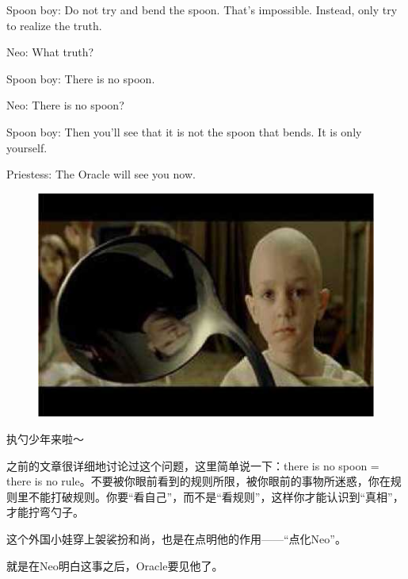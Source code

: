 \documentclass{ctexart}
\newenvironment{myquote}{\color{green} \setlength{\leftskip}{6em} \setlength{\rightskip}{4em} \setlength{\parindent}{-2em}}{\par}
\begin{document}
\begin{myquote}
Spoon boy: Do not try and bend the spoon. That's impossible. Instead, only try to realize the truth.

Neo: What truth?

Spoon boy: There is no spoon.

Neo: There is no spoon?

Spoon boy: Then you'll see that it is not the spoon that bends. It is only yourself.

Priestess: The Oracle will see you now.
\end{myquote}

\begin{figure}[htb]
\centering
\includegraphics[width=0.5\linewidth]{fig/read_Matrix-45}
\end{figure}

执勺少年来啦～

之前的文章很详细地讨论过这个问题，这里简单说一下：there is no spoon = there is no rule。不要被你眼前看到的规则所限，被你眼前的事物所迷惑，你在规则里不能打破规则。你要“看自己”，而不是“看规则”，这样你才能认识到“真相”，才能拧弯勺子。

这个外国小娃穿上袈裟扮和尚，也是在点明他的作用——“点化Neo”。

就是在Neo明白这事之后，Oracle要见他了。
\end{document}
